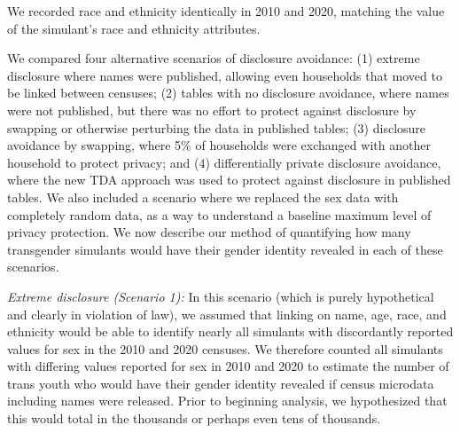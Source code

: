 \documentclass{jpc} %
\theoremstyle{plain}\newtheorem{satz}[thm]{Satz} %
\begin{document}
We recorded race and ethnicity identically in 2010 and 2020, matching the value of the simulant's race and ethnicity attributes.

We compared four alternative scenarios of disclosure avoidance: (1) extreme disclosure where names were published, allowing even households that moved to be linked between censuses; (2) tables with no disclosure avoidance, where names were not published, but there was no effort to protect against disclosure by swapping or otherwise perturbing the data in published tables; (3) disclosure avoidance by swapping, where 5\% of households were exchanged with another household to protect privacy; and (4) differentially private disclosure avoidance, where the new TDA approach was used to protect against disclosure in published tables.  We also included a scenario where we replaced the sex data with completely random data, as a way to understand a baseline maximum level of privacy protection.  We now describe our method of quantifying how many transgender simulants would have their gender identity revealed in each of these scenarios.

\emph{Extreme disclosure (Scenario 1):} In this scenario (which is purely hypothetical and clearly in violation of law), we assumed that linking on name, age, race, and ethnicity would be able to identify nearly all simulants with discordantly reported values for sex in the 2010 and 2020 censuses.  We therefore counted all simulants with differing values reported for sex in 2010 and 2020 to estimate the number of trans youth who would have their gender identity revealed if census microdata including names were released.  Prior to beginning analysis, we hypothesized that this would total in the thousands or perhaps even tens of thousands.
\end{document}
